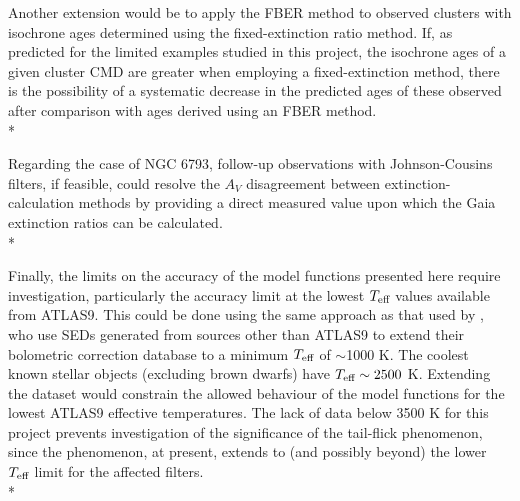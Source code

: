 \documentclass[12pt, a4paper]{report}
\begin{document}
Another extension would be to apply the FBER method to observed clusters with isochrone ages determined using the fixed-extinction ratio method. If, as predicted for the limited examples studied in this project, the isochrone ages of a given cluster CMD are greater when employing a fixed-extinction method, there is the possibility of a systematic decrease in the predicted ages of these observed after comparison with ages derived using an FBER method.\\*

Regarding the case of NGC 6793, follow-up observations with Johnson-Cousins filters, if feasible, could resolve the $A_{V}$ disagreement between extinction-calculation methods by providing a direct measured value upon which the Gaia extinction ratios can be calculated.\\*

Finally, the limits on the accuracy of the model functions presented here require investigation, particularly the accuracy limit at the lowest $T_{\textnormal{eff}}$ values available from ATLAS9. This could be done using the same approach as that used by \cite{2008PASP..120..583G}, who use SEDs generated from sources other than ATLAS9 to extend their bolometric correction database to a minimum $T_{\textnormal{eff}}$ of $\sim$1000 K. The coolest known stellar objects (excluding brown dwarfs) have $T_{\textnormal{eff}} \sim 2500$ K. Extending the dataset would constrain the allowed behaviour of the model functions for the lowest ATLAS9 effective temperatures. The lack of data below 3500 K for this project prevents investigation of the significance of the tail-flick phenomenon, since the phenomenon, at present, extends to (and possibly beyond) the lower $T_{\textnormal{eff}}$ limit for the affected filters.\\*

%

\end{document}
